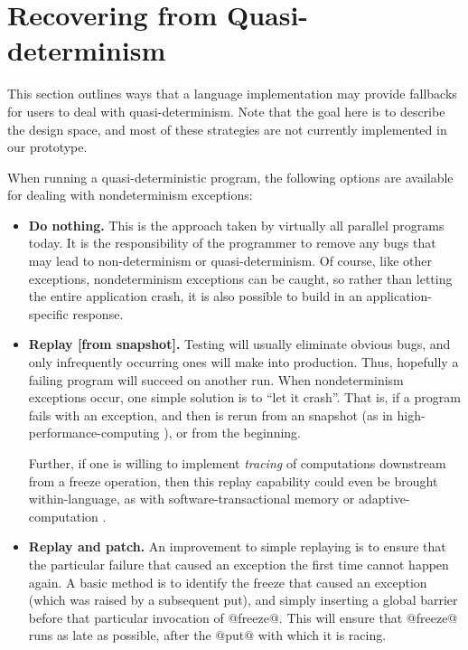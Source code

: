 

\section{Recovering from Quasi-determinism}\label{section:recovering}

This section outlines ways that a language implementation may provide fallbacks
for users to deal with quasi-determinism.  Note that the goal here is to
describe the design space, and most of these strategies are not currently
implemented in our prototype.

When running a quasi-deterministic program, the following options are available
for dealing with nondeterminism exceptions:

\begin{itemize}
\item {\bf Do nothing.}  This is the approach taken by virtually all parallel
  programs today.  It is the responsibility of the programmer to remove any bugs
  that may lead to non-determinism or quasi-determinism.  Of course, like other
  exceptions, nondeterminism exceptions can be caught, so rather than letting
  the entire application crash, it is also possible to build in an
  application-specific response.

\item {\bf Replay [from snapshot].}  
%
Testing will usually eliminate obvious bugs, and only infrequently occurring
ones will make into production.  
Thus, hopefully a failing program will succeed on another run. 
When nondeterminism exceptions occur, one simple solution is to ``let it crash''.
That is, if a program fails with an exception, and then is rerun from an
snapshot (as in high-performance-computing \cite{hpc-snapshots}), or from the
beginning.


Further, if one is willing to implement {\em tracing} of computations downstream from a
freeze operation, then this replay capability could even be brought
within-language, as with software-transactional memory \cite{haskell-STM} or
adaptive-computation \cite{umut-adaptive-comp}.

\item {\bf Replay and patch.}  An improvement to simple replaying
  is to ensure that the particular
  failure that caused an exception the first time cannot happen again.  
  A basic method is to 
  identify the freeze that caused an exception (which was raised by a
  subsequent put), and simply inserting a global barrier before that particular
  invocation of @freeze@.  This will ensure
  that @freeze@ runs as late as possible, after the @put@ with which it is racing.
\end{itemize}

